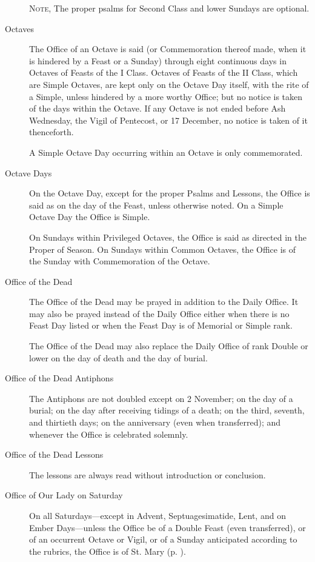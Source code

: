 \begin{description}
\textsc{Note,} The proper psalms for Second Class and lower Sundays are optional.
\item[Octaves] The Office of an Octave is said (or Commemoration thereof made, when it is hindered by a Feast or a Sunday) through eight continuous days in Octaves of Feasts of the I Class. Octaves of Feasts of the II Class, which are Simple Octaves, are kept only on the Octave Day itself, with the rite of a Simple, unless hindered by a more worthy Office; but no notice is taken of the days within the Octave. If any Octave is not ended before Ash Wednesday, the Vigil of Pentecost, or 17 December, no notice is taken of it thenceforth.\par
A Simple Octave Day occurring within an Octave is only commemorated.
\item[Octave Days] On the Octave Day, except for the proper Psalms and Lessons, the Office is said as on the day of the Feast, unless otherwise noted. On a Simple Octave Day the Office is Simple.
\par
On Sundays within Privileged Octaves, the Office is said as directed in the Proper of Season. On Sundays within Common Octaves, the Office is of the Sunday with Commemoration of the Octave.
\item[Office of the Dead] The Office of the Dead may be prayed in addition to the Daily Office. It may also be prayed instead of the Daily Office either when there is no Feast Day listed or when the Feast Day is of Memorial or Simple rank.\par
The Office of the Dead may also replace the Daily Office of rank Double or lower on the day of death and the day of burial.
\item[Office of the Dead Antiphons] The Antiphons are not doubled except on 2 November; %
on the day of a burial; on the day after receiving tidings of a death; on the third, seventh, and thirtieth days; on the anniversary (even when transferred); and whenever the Office is celebrated solemnly.
\item[Office of the Dead Lessons] The lessons are always read without introduction or conclusion.
\item[Office of Our Lady on Saturday] On all Saturdays---except in Advent, Septuagesimatide, Lent, and on Ember Days---unless the Office be of a Double Feast (even transferred), or of an occurrent Octave or Vigil, or of a Sunday anticipated according to the rubrics, the Office is of St. Mary (p. \pageref{MarySaturday}).

\end{description}

